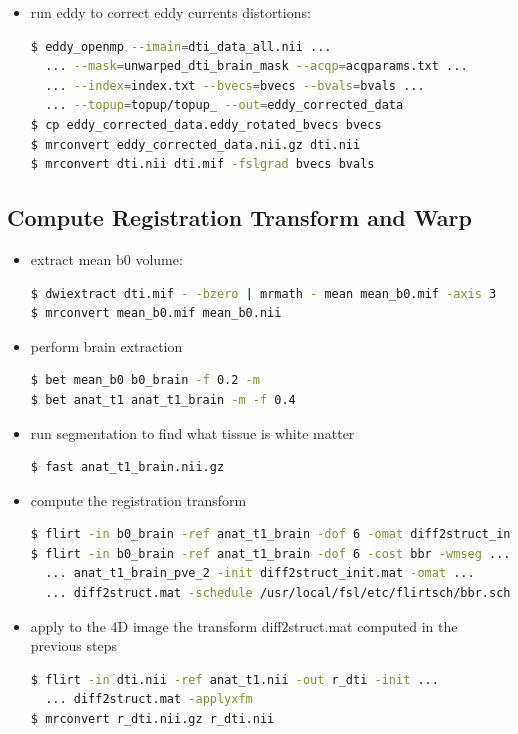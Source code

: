 \documentclass[a4paper,11pt]{article}
\begin{document}
\begin{itemize}
\item run eddy to correct eddy currents distortions:
\begin{lstlisting}[language=bash]
$ eddy_openmp --imain=dti_data_all.nii ... 
  ... --mask=unwarped_dti_brain_mask --acqp=acqparams.txt ...
  ... --index=index.txt --bvecs=bvecs --bvals=bvals ...
  ... --topup=topup/topup_ --out=eddy_corrected_data
$ cp eddy_corrected_data.eddy_rotated_bvecs bvecs
$ mrconvert eddy_corrected_data.nii.gz dti.nii
$ mrconvert dti.nii dti.mif -fslgrad bvecs bvals
\end{lstlisting}

\end{itemize}

\subsection{Compute Registration Transform and Warp}

\begin{itemize}

\item extract mean b0 volume:
\begin{lstlisting}[language=bash]
$ dwiextract dti.mif - -bzero | mrmath - mean mean_b0.mif -axis 3  
$ mrconvert mean_b0.mif mean_b0.nii
\end{lstlisting}

\item perform brain extraction
\begin{lstlisting}[language=bash]
$ bet mean_b0 b0_brain -f 0.2 -m
$ bet anat_t1 anat_t1_brain -m -f 0.4
\end{lstlisting}

\item run segmentation to find what tissue is white matter
\begin{lstlisting}[language=bash]
$ fast anat_t1_brain.nii.gz 
\end{lstlisting}

\item compute the registration transform
\begin{lstlisting}[language=bash]
$ flirt -in b0_brain -ref anat_t1_brain -dof 6 -omat diff2struct_init.mat
$ flirt -in b0_brain -ref anat_t1_brain -dof 6 -cost bbr -wmseg ...
  ... anat_t1_brain_pve_2 -init diff2struct_init.mat -omat ... 
  ... diff2struct.mat -schedule /usr/local/fsl/etc/flirtsch/bbr.sch
\end{lstlisting}

 \item apply to the 4D image the transform diff2struct.mat computed in the previous steps
\begin{lstlisting}[language=bash]
$ flirt -in dti.nii -ref anat_t1.nii -out r_dti -init ...
  ... diff2struct.mat -applyxfm
$ mrconvert r_dti.nii.gz r_dti.nii
\end{lstlisting}

\end{itemize}
\end{document}
